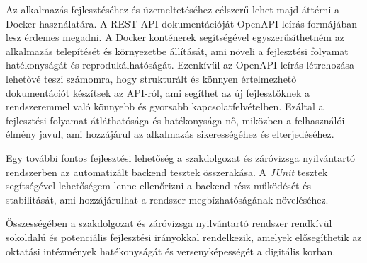 Az alkalmazás fejlesztéséhez és üzemeltetéséhez célszerű lehet majd áttérni a Docker használatára. A REST API dokumentációját OpenAPI leírás formájában lesz érdemes megadni. A Docker konténerek segítségével egyszerűsíthetném az alkalmazás telepítését és környezetbe állítását, ami növeli a fejlesztési folyamat hatékonyságát és reprodukálhatóságát. Ezenkívül az OpenAPI leírás létrehozása lehetővé teszi számomra, hogy strukturált és könnyen értelmezhető dokumentációt készítsek az API-ról, ami segíthet az új fejlesztőknek a rendszeremmel való könnyebb és gyorsabb kapcsolatfelvételben. Ezáltal a fejlesztési folyamat átláthatósága és hatékonysága nő, miközben a felhasználói élmény javul, ami hozzájárul az alkalmazás sikerességéhez és elterjedéséhez.

Egy további fontos fejlesztési lehetőség a szakdolgozat és záróvizsga nyilvántartó rendszerben az automatizált backend tesztek összerakása. A \textit{JUnit} tesztek segítségével lehetőségem lenne ellenőrizni a backend rész működését és stabilitását, ami hozzájárulhat a rendszer megbízhatóságának növeléséhez. 

Összességében a szakdolgozat és záróvizsga nyilvántartó rendszer rendkívül sokoldalú és potenciális fejlesztési irányokkal rendelkezik, amelyek elősegíthetik az oktatási intézmények hatékonyságát és versenyképességét a digitális korban.